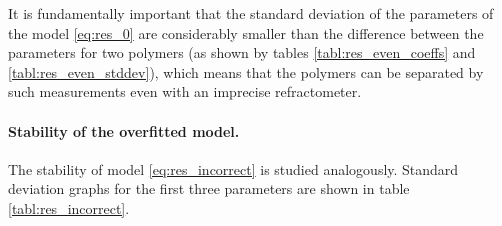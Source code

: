 \documentclass[11pt,a4paper]{article}
\theoremstyle{definition}
\begin{document}
It is fundamentally important that the standard deviation of the parameters of the model \eqref{eq:res_0}
are considerably smaller than the difference between the parameters for two polymers (as shown
by tables \ref{tabl:res_even_coeffs} and \ref{tabl:res_even_stddev}), which means that the polymers
can be separated by such measurements even with an imprecise refractometer.

\paragraph{Stability of the overfitted model.}

The stability of model \eqref{eq:res_incorrect} is studied analogously. Standard deviation
graphs for the first three parameters are shown in table \ref{tabl:res_incorrect}.
\end{document}
